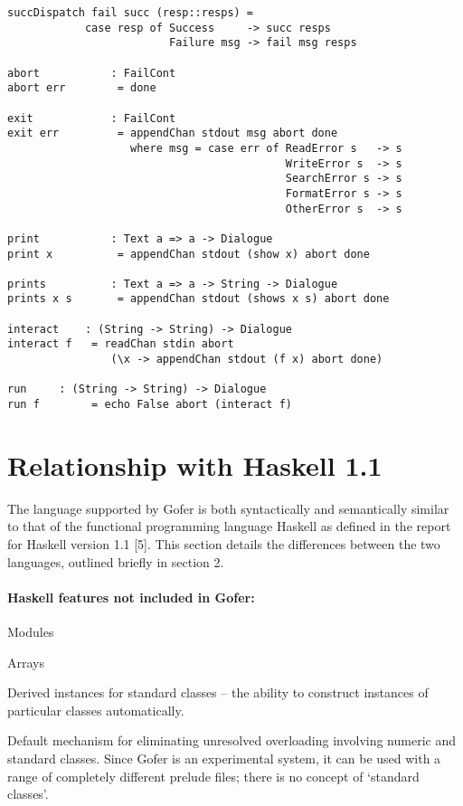 \begin{verbatim}
succDispatch fail succ (resp::resps) = 
            case resp of Success     -> succ resps
                         Failure msg -> fail msg resps

abort           : FailCont
abort err        = done

exit            : FailCont
exit err         = appendChan stdout msg abort done
                   where msg = case err of ReadError s   -> s
                                           WriteError s  -> s
                                           SearchError s -> s
                                           FormatError s -> s
                                           OtherError s  -> s

print           : Text a => a -> Dialogue
print x          = appendChan stdout (show x) abort done

prints          : Text a => a -> String -> Dialogue
prints x s       = appendChan stdout (shows x s) abort done

interact	: (String -> String) -> Dialogue
interact f	 = readChan stdin abort
			    (\x -> appendChan stdout (f x) abort done)

run		: (String -> String) -> Dialogue
run f		 = echo False abort (interact f)

\end{verbatim}

\chapter{Relationship with Haskell 1.1}

The language supported by Gofer is both syntactically and  semantically
similar to that of  the  functional  programming  language  Haskell  as
defined in the report  for  Haskell  version  1.1  [5].   This  section
details the differences between the two languages, outlined briefly  in
section 2.

\subsubsection*{Haskell features not included in Gofer:}
\BI
\IT  Modules

\IT  Arrays

\IT  Derived instances for standard classes -- the ability to construct
     instances of particular classes automatically.

\IT  Default mechanism for eliminating unresolved overloading involving
     numeric and standard classes.   Since  Gofer  is  an  experimental
     system, it can be  used  with  a  range  of  completely  different
     prelude files; there is no concept of `standard classes'.

